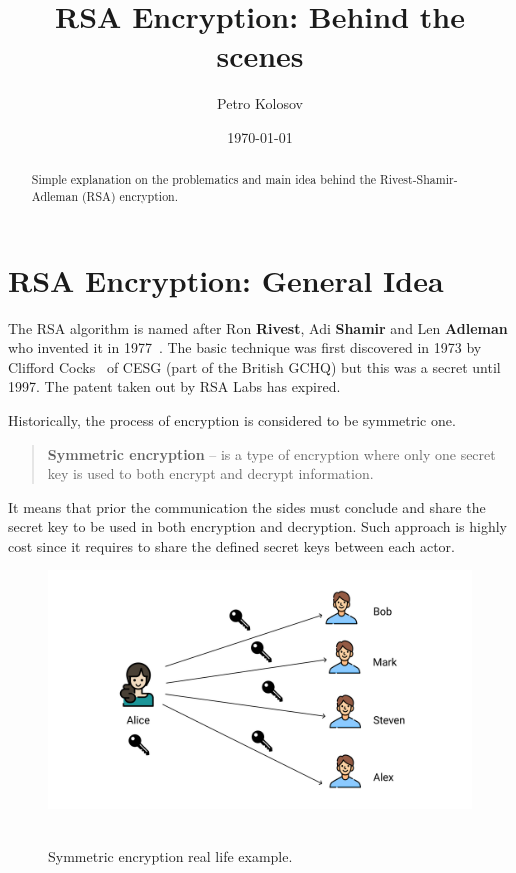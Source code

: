 \documentclass[12pt,letterpaper,oneside,reqno]{amsart}
\title[RSA Encryption: Behind the scenes]{RSA Encryption: Behind the scenes}
\author[Petro Kolosov]{Petro Kolosov}
\date{\today}
\begin{document}
    \begin{abstract}
        Simple explanation on the problematics and main idea behind the Rivest-Shamir-Adleman (RSA) encryption.
    \end{abstract}
    \maketitle
    \tableofcontents


    \section{RSA Encryption: General Idea}\label{sec:rsa-encryption-algorithm}
    The RSA algorithm is named after Ron \textbf{Rivest}, Adi \textbf{Shamir} and Len \textbf{Adleman}
    who invented it in 1977~\cite{rivest1978method}.
    The basic technique was first discovered in 1973 by Clifford Cocks~\cite{cocks1973note} of CESG (part of the British GCHQ)
    but this was a secret until 1997.
    The patent taken out by RSA Labs has expired.

    Historically, the process of encryption is considered to be symmetric one.
    \begin{quote}
        \textbf{Symmetric encryption} -- is a type of encryption where only one secret key is
        used to both encrypt and decrypt information.
    \end{quote}
    It means that prior the communication the sides must conclude and share the secret key to be used in
    both encryption and decryption.
    Such approach is highly cost since it requires to share the defined secret keys between each actor.

    \begin{figure}[H]
        \centering
        \includegraphics[width=1.15\textwidth]{Symmetric_encryption}
        ~\caption{Symmetric encryption real life example.}\label{fig:figure}
    \end{figure}
\end{document}
